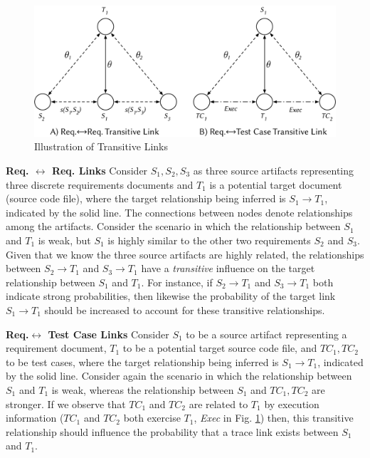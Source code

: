 \begin{figure}%
\centering
\includegraphics[width=\columnwidth]{graphics/applicationsI-approach/fig2_transitive-links.pdf}
\caption{Illustration of Transitive Links}
\label{fig:trans-req2req}
\end{figure}

{\textbf{Req. $\leftrightarrow$ Req. Links}} Consider $S_1,S_2,S_3$ as three source artifacts representing three discrete requirements documents and $T_1$ is a potential target document (\ie source code file), where the target relationship being inferred is $S_1\rightarrow T_1$, indicated by the solid line. The connections between nodes denote relationships among the artifacts. Consider the scenario in which the relationship between $S_1$ and $T_1$ is weak, but $S_1$ is highly similar to the other two requirements $S_2$ and $S_3$. Given that we know the three source artifacts are highly related, the relationships between $S_2\rightarrow T_1$ and $S_3\rightarrow T_1$ have a \textit{transitive} influence on the target relationship between $S_1$ and $T_1$. For instance, if $S_2\rightarrow T_1$ and $S_3\rightarrow T_1$ both indicate strong probabilities, then likewise the probability of the target link $S_1\rightarrow T_1$ should be increased to account for these transitive relationships.

{\textbf{Req.$\leftrightarrow$ Test Case Links}} Consider $S_1$ to be a source artifact representing a requirement document, $T_1$ to be a potential target source code file, and $TC_1,TC_2$ to be test cases, where the target relationship being inferred is $S_1\rightarrow T_1$, indicated by the solid line. Consider again the scenario in which the relationship between $S_1$ and $T_1$ is weak, whereas the relationship between $S_1$ and $TC_1,TC_2$ are stronger. If we observe that $TC_1$ and $TC_2$ are related to $T_1$ by execution information (\eg $TC_1$ and $TC_2$ both exercise $T_1$, \textit{Exec} in Fig. \ref{fig:trans-req2req}) then, this transitive relationship should influence the probability that a trace link exists between $S_1$ and $T_1$.

